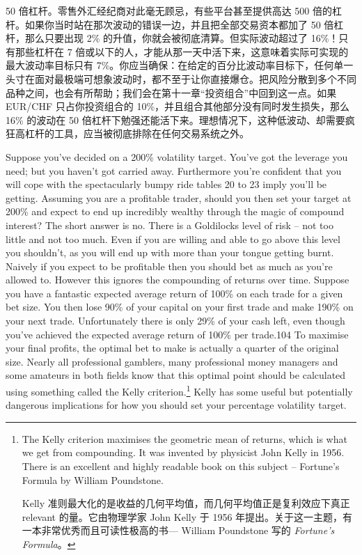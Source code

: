 \begin{chineseblock} 50 倍杠杆。零售外汇经纪商对此毫无顾忌，有些平台甚至提供高达 500 倍的杠杆。如果你当时站在那次波动的错误一边，并且把全部交易资本都加了 50 倍杠杆，那么只要出现 2\% 的升值，你就会被彻底清算。但实际波动超过了 16\%！只有那些杠杆在 7 倍或以下的人，才能从那一天中活下来，这意味着实际可实现的最大波动率目标只有 7\%。你应当确保：在给定的百分比波动率目标下，任何单一头寸在面对最极端可想象波动时，都不至于让你直接爆仓。把风险分散到多个不同品种之间，也会有所帮助；我们会在第十一章“投资组合”中回到这一点。如果 EUR/CHF 只占你投资组合的 10\%，并且组合其他部分没有同时发生损失，那么 16\% 的波动在 50 倍杠杆下勉强还能活下来。理想情况下，这种低波动、却需要疯狂高杠杆的工具，应当被彻底排除在任何交易系统之外。\end{chineseblock}


\begin{englishblock} Suppose you've decided on a 200\% volatility target. You've got the leverage you need; but you haven't got carried away. Furthermore you're confident that you will cope with the spectacularly bumpy ride tables 20 to 23 imply you'll be getting. Assuming you are a profitable trader, should you then set your target at 200\% and expect to end up incredibly wealthy through the magic of compound interest? The short answer is no. There is a Goldilocks level of risk -- not too little and not too much. Even if you are willing and able to go above this level you shouldn't, as you will end up with more than your tongue getting burnt. Naively if you expect to be profitable then you should bet as much as you're allowed to. However this ignores the compounding of returns over time. Suppose you have a fantastic expected average return of 100\% on each trade for a given bet size. You then lose 90\% of your capital on your first trade and make 190\% on your next trade. Unfortunately there is only 29\% of your cash left, even though you've achieved the expected average return of 100\% per trade.104 To maximise your final profits, the optimal bet to make is actually a quarter of the original size. Nearly all professional gamblers, many professional money managers and some amateurs in both fields know that this optimal point should be calculated using something called the Kelly criterion.\footnote{The Kelly criterion maximises the geometric mean of returns, which is what we get from compounding. It was invented by physicist John Kelly in 1956. There is an excellent and highly readable book on this subject -- Fortune's Formula by William Poundstone. \par Kelly 准则最大化的是收益的几何平均值，而几何平均值正是复利效应下真正 relevant 的量。它由物理学家 John Kelly 于 1956 年提出。关于这一主题，有一本非常优秀而且可读性极高的书--- William Poundstone 写的 \textit{Fortune's Formula}。} Kelly has some useful but potentially dangerous implications for how you should set your percentage volatility target. \end{englishblock}

